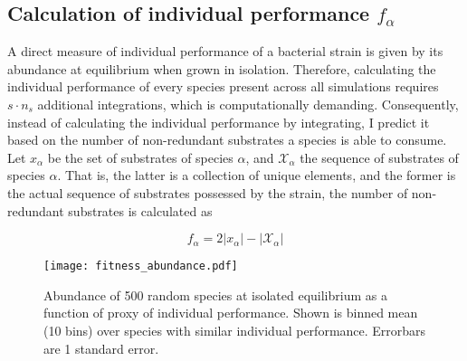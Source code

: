 \documentclass[titlepage,11pt]{article}
\begin{document}
	\subsection{Calculation of individual performance $ f_{\alpha} $}\label{subsec:fitness_calculation}
		A direct measure of individual performance of a bacterial strain is given by its abundance at equilibrium when grown in isolation. Therefore, calculating the individual performance of every species present across all simulations requires $ s \cdot n_{s} $ additional integrations, which is computationally demanding. Consequently, instead of calculating the individual performance by integrating, I predict it based on the number of non-redundant substrates a species is able to consume. Let $ x_{\alpha} $ be the set of substrates of species $ \alpha $, and $ \mathcal{X}_{\alpha} $ the sequence of substrates of species $ \alpha $. That is, the latter is a collection of unique elements, and the former is the actual sequence of substrates possessed by the strain, the number of non-redundant substrates is calculated as
		\begin{linenomath*}
			\begin{equation}
				f_{\alpha} = 2 |x_{\alpha}| - |\mathcal{X}_{\alpha}|
			\end{equation}
		\end{linenomath*}
		\begin{SCfigure}[1][h]
			\centering			
			\texttt{[image: fitness\_abundance.pdf]}
			\caption{Abundance of 500 random species at isolated equilibrium as a function of proxy of individual performance. Shown is binned mean (10 bins) over species with similar individual performance. Errorbars are 1 standard error.}
			\label{fig:fitness_abundance}
		\end{SCfigure}
\end{document}
